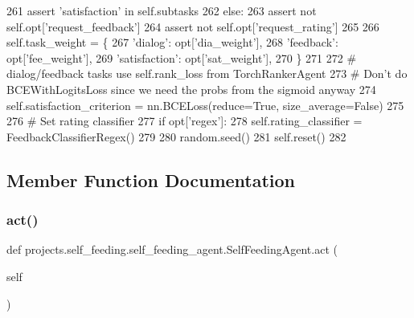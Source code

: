 \begin{DoxyCode}
261             \textcolor{keyword}{assert} \textcolor{stringliteral}{'satisfaction'} \textcolor{keywordflow}{in} self.subtasks
262         \textcolor{keywordflow}{else}:
263             \textcolor{keyword}{assert} \textcolor{keywordflow}{not} self.opt[\textcolor{stringliteral}{'request\_feedback'}]
264             \textcolor{keyword}{assert} \textcolor{keywordflow}{not} self.opt[\textcolor{stringliteral}{'request\_rating'}]
265 
266         self.task\_weight = \{
267             \textcolor{stringliteral}{'dialog'}: opt[\textcolor{stringliteral}{'dia\_weight'}],
268             \textcolor{stringliteral}{'feedback'}: opt[\textcolor{stringliteral}{'fee\_weight'}],
269             \textcolor{stringliteral}{'satisfaction'}: opt[\textcolor{stringliteral}{'sat\_weight'}],
270         \}
271 
272         \textcolor{comment}{# dialog/feedback tasks use self.rank\_loss from TorchRankerAgent}
273         \textcolor{comment}{# Don't do BCEWithLogitsLoss since we need the probs from the sigmoid anyway}
274         self.satisfaction\_criterion = nn.BCELoss(reduce=\textcolor{keyword}{True}, size\_average=\textcolor{keyword}{False})
275 
276         \textcolor{comment}{# Set rating classifier}
277         \textcolor{keywordflow}{if} opt[\textcolor{stringliteral}{'regex'}]:
278             self.rating\_classifier = FeedbackClassifierRegex()
279 
280         random.seed()
281         self.reset()
282 
\end{DoxyCode}


\subsection{Member Function Documentation}
\mbox{\label{classprojects_1_1self__feeding_1_1self__feeding__agent_1_1SelfFeedingAgent_aeb85e03ea2d8dfebd9cb29d717bea763}} 
\subsubsection{\texorpdfstring{act()}{act()}}
{\footnotesize\ttfamily def projects.\+self\+\_\+feeding.\+self\+\_\+feeding\+\_\+agent.\+Self\+Feeding\+Agent.\+act (\begin{DoxyParamCaption}\item[{}]{self }\end{DoxyParamCaption})}



